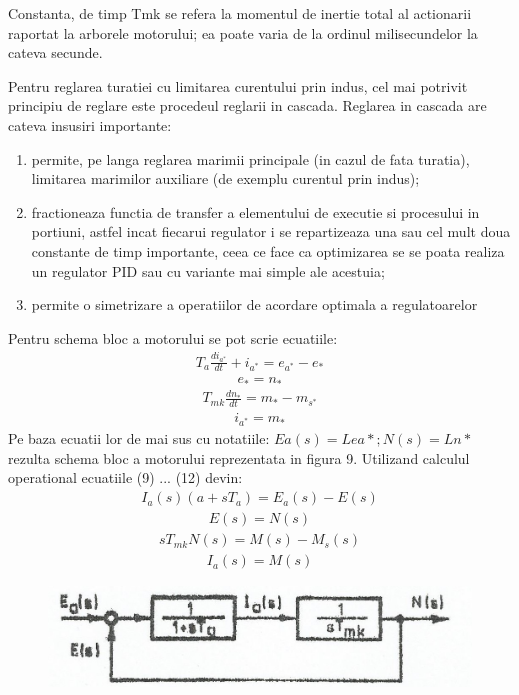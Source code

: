 \documentclass[11pt]{article}
\begin{document}
Constanta, de timp Tmk se refera la momentul de inertie total al actionarii raportat la arborele motorului; ea poate varia de la ordinul milisecundelor la cateva secunde. 

Pentru reglarea turatiei cu limitarea curentului prin indus, cel mai potrivit principiu de reglare este procedeul reglarii in cascada. Reglarea in cascada are cateva insusiri importante: 
\begin{enumerate}[label=$\bullet$]
	\item permite, pe langa reglarea marimii principale (in cazul de fata turatia), limitarea marimilor auxiliare (de exemplu curentul prin indus); 
	\item fractioneaza functia de transfer a elementului de executie si procesului in portiuni, astfel incat fiecarui regulator i se repartizeaza una sau cel mult doua constante de timp importante, ceea ce face ca optimizarea se se poata realiza un regulator PID sau cu variante mai simple ale acestuia; 
	\item permite o simetrizare a operatiilor de acordare optimala a regulatoarelor 
\end{enumerate}
Pentru schema bloc a motorului se pot scrie ecuatiile:
\begin{align}
T_a\frac{di_{a^*}}{dt}+i_{a^*}=e_{a^*}-e_*
\end{align}
\begin{align}
e_*=n_*
\end{align}
\begin{align}
T_{mk}\frac{dn_{*}}{dt}=m_{*}-m_{s^*}
\end{align}
\begin{align}
i_{a^*}=m_*
\end{align}
Pe baza ecuatii lor de mai sus cu notatiile: $Ea(s) = L{ea*}; N(s) = L{n*}$ rezulta schema bloc a motorului reprezentata in figura 9.
Utilizand calculul operational ecuatiile (9) ... (12) devin:
\begin{align}
I_a(s)(a+sT_a)=E_a(s)-E(s)
\end{align}
\begin{align}
E(s)=N(s)
\end{align}
\begin{align}
sT_{mk}N(s)=M(s)-M_s(s)
\end{align}
\begin{align}
I_a(s)=M(s)
\end{align}
\begin{figure}[H]
	\centering
	\includegraphics[width=.5\linewidth]{fig10.png}
	\label{fig:test2}
\end{figure}
\end{document}
